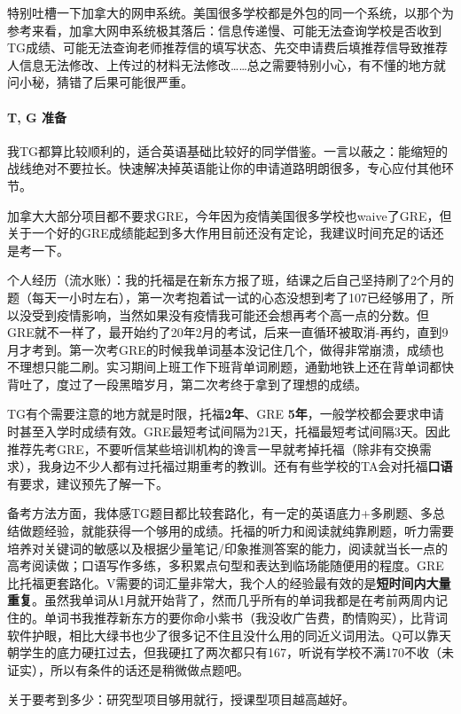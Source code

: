 特别吐槽一下加拿大的网申系统。美国很多学校都是外包的同一个系统，以那个为参考来看，加拿大网申系统极其落后：信息传递慢、可能无法查询学校是否收到TG成绩、可能无法查询老师推荐信的填写状态、先交申请费后填推荐信导致推荐人信息无法修改、上传过的材料无法修改……总之需要特别小心，有不懂的地方就问小秘，猜错了后果可能很严重。

\paragraph{T, G 准备}
我TG都算比较顺利的，适合英语基础比较好的同学借鉴。一言以蔽之：能缩短的战线绝对不要拉长。快速解决掉英语能让你的申请道路明朗很多，专心应付其他环节。

加拿大大部分项目都不要求GRE，今年因为疫情美国很多学校也waive了GRE，但关于一个好的GRE成绩能起到多大作用目前还没有定论，我建议时间充足的话还是考一下。

个人经历（流水账）：我的托福是在新东方报了班，结课之后自己坚持刷了2个月的题（每天一小时左右），第一次考抱着试一试的心态没想到考了107已经够用了，所以没受到疫情影响，当然如果没有疫情我可能还会想再考个高一点的分数。但GRE就不一样了，最开始约了20年2月的考试，后来一直循环被取消-再约，直到9月才考到。第一次考GRE的时候我单词基本没记住几个，做得非常崩溃，成绩也不理想只能二刷。实习期间上班工作下班背单词刷题，通勤地铁上还在背单词都快背吐了，度过了一段黑暗岁月，第二次考终于拿到了理想的成绩。

TG有个需要注意的地方就是时限，托福{\bf{2年}}、GRE {\bf{5年}}，一般学校都会要求申请时甚至入学时成绩有效。GRE最短考试间隔为21天，托福最短考试间隔3天。因此推荐先考GRE，不要听信某些培训机构的谗言一早就考掉托福（除非有交换需求），我身边不少人都有过托福过期重考的教训。还有有些学校的TA会对托福{\bf{口语}}有要求，建议预先了解一下。

备考方法方面，我体感TG题目都比较套路化，有一定的英语底力+多刷题、多总结做题经验，就能获得一个够用的成绩。托福的听力和阅读就纯靠刷题，听力需要培养对关键词的敏感以及根据少量笔记/印象推测答案的能力，阅读就当长一点的高考阅读做；口语写作多练，多积累点句型和表达到临场能随便用的程度。GRE比托福更套路化。V需要的词汇量非常大，我个人的经验最有效的是{\bf{短时间内大量重复}}。虽然我单词从1月就开始背了，然而几乎所有的单词我都是在考前两周内记住的。单词书我推荐新东方的要你命小紫书（我没收广告费，酌情购买），比背词软件护眼，相比大绿书也少了很多记不住且没什么用的同近义词用法。Q可以靠天朝学生的底力硬扛过去，但我硬扛了两次都只有167，听说有学校不满170不收（未证实），所以有条件的话还是稍微做点题吧。

关于要考到多少：研究型项目够用就行，授课型项目越高越好。

